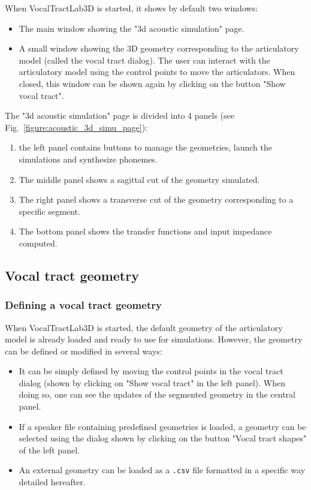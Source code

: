 \documentclass[]{article}
\begin{document}
	When VocalTractLab3D is started, it shows by default two windows:
	\begin{itemize}
		\item The main window showing the "3d acoustic simulation" page.
		\item A small window showing the 3D geometry corresponding to the articulatory model (called the vocal tract dialog). The user can interact with the articulatory model using the control points to move the articulators. When closed, this window can be shown again by clicking on the button "Show vocal tract".
	\end{itemize}

	The "3d acoustic simulation" page is divided into 4 panels (see Fig.~\ref{figure:acoustic_3d_simu_page}):
	\begin{enumerate}
		\item the left panel contains buttons to manage the geometries, launch the simulations and synthesize phonemes.
		\item The middle panel shows a sagittal cut of the geometry simulated.
		\item The right panel shows a transverse cut of the geometry corresponding to a specific segment.
		\item The bottom panel shows the transfer functions and 
		input impedance computed. 
	\end{enumerate}

	\subsection{Vocal tract geometry}

	\subsubsection{Defining a vocal tract geometry}
	
	When VocalTractLab3D is started, the default geometry of the articulatory model is already loaded and ready to use for 
	simulations.
	However, the geometry can be defined or modified in several ways:
	\begin{itemize}
		\item It can be simply defined by moving the control points in
		the vocal tract dialog (shown by clicking on "Show vocal tract" in the left panel). 
		When doing so, one can see the updates of the segmented 
		geometry in the central panel.
		\item If a speaker file containing predefined geometries is loaded, a geometry can be selected using the dialog shown by 
		clicking on the button "Vocal tract shapes" of the left panel.
		\item An external geometry can be loaded as a \texttt{.csv} file
		formatted in a specific way detailed hereafter. 
	\end{itemize}
\end{document}
